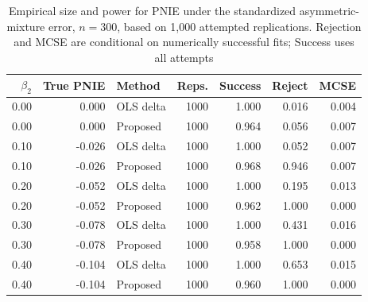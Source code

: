 \begin{table}[htbp]
\centering
\caption{Empirical size and power for PNIE under the standardized asymmetric-mixture error, $n=300$, based on 1,000 attempted replications. Rejection and MCSE are conditional on numerically successful fits; Success uses all attempts}
\label{tab:size_power}
\begin{tabular}{rrlrrrr}
\toprule
$\beta_2$ & True PNIE & Method & Reps. & Success & Reject & MCSE \\
\midrule
0.00 & 0.000 & OLS delta & 1000 & 1.000 & 0.016 & 0.004 \\
0.00 & 0.000 & Proposed & 1000 & 0.964 & 0.056 & 0.007 \\
0.10 & -0.026 & OLS delta & 1000 & 1.000 & 0.052 & 0.007 \\
0.10 & -0.026 & Proposed & 1000 & 0.968 & 0.946 & 0.007 \\
0.20 & -0.052 & OLS delta & 1000 & 1.000 & 0.195 & 0.013 \\
0.20 & -0.052 & Proposed & 1000 & 0.962 & 1.000 & 0.000 \\
0.30 & -0.078 & OLS delta & 1000 & 1.000 & 0.431 & 0.016 \\
0.30 & -0.078 & Proposed & 1000 & 0.958 & 1.000 & 0.000 \\
0.40 & -0.104 & OLS delta & 1000 & 1.000 & 0.653 & 0.015 \\
0.40 & -0.104 & Proposed & 1000 & 0.960 & 1.000 & 0.000 \\
\bottomrule
\end{tabular}
\end{table}
